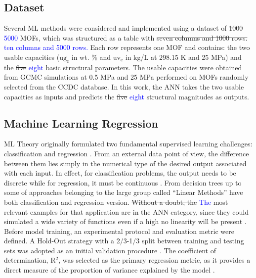 \documentclass[review]{elsarticle}
\newcommand{\ugc}{\mathrm{ug_c}}
\newcommand{\uvc}{\mathrm{uv_c}}
\begin{document}
\subsection{Dataset}

Several ML methods were considered and implemented using a dataset of \sout{1000} 
\textcolor{blue}{5000}  
MOFs, which was structured as a table with \sout{seven columns and 1000 rows.}
\textcolor{blue}{ten columns and 5000 rows.} Each 
row represents one MOF and contains: the two usable capacities ($\ugc$ in wt. 
\% and $\uvc$ in kg/L at 298.15 K and 25 MPa) and the \sout{five} 
\textcolor{blue}{eight} basic structural 
parameters. The usable capacities were obtained from GCMC simulations at 0.5 
MPa and 25 MPa performed on MOFs randomly selected from the CCDC database. In 
this work, the ANN takes the two usable capacities as inputs and predicts the 
\sout{five} \textcolor{blue}{eight} structural magnitudes as outputs. 



\subsection{Machine Learning Regression \label{subsec:MLR}}

ML Theory originally formulated two fundamental supervised learning challenges: classification and regression \cite{hastie2009elements, bishop2006}.  From an external data point of view, the difference between them lies simply in the numerical type of the desired output associated with each input. In effect, for classification problems, the output needs to be discrete while for regression, it must be continuous \cite{mitchell97}. From decision trees up to some of approaches belonging to the large group called ``Linear Methods'' have both classification and regression version. \sout{Without a doubt, the} \textcolor{blue}{The} most relevant examples for that application are in the ANN category, since they could simulated a wide variety of functions even if a high no linearity will be present \cite{witten2011data}. Before model training, an experimental protocol and evaluation metric were defined. A Hold-Out strategy with a 2/3-1/3 split between training and testing sets was adopted as an initial validation procedure \cite{hastie2009elements}. The coefficient of determination, R$^2$, was selected as the primary regression metric, as it provides a direct measure of the proportion of variance explained by the model \cite{james2021}.
\end{document}
